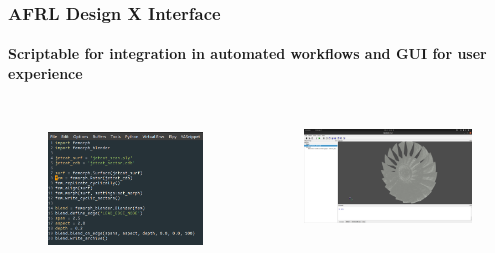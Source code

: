 \documentclass[t]{beamer}
\begin{document}
\begin{frame}
  \frametitle{AFRL Design X Interface}
  \framesubtitle{Scriptable for integration in automated workflows and GUI for user experience}

 \begin{columns}
    \begin{column}{0.5\textwidth}
      
        \begin{figure}
          \includegraphics[height=1.5in]{./figures/script.png}
          
        \end{figure}

    \end{column}
    \begin{column}{0.5\textwidth}

      \begin{figure}
       \includegraphics[height=1.25in]{./figures/GUI.png}
      \end{figure}
      
    \end{column}
  \end{columns}

\end{frame}
 
\end{document}
